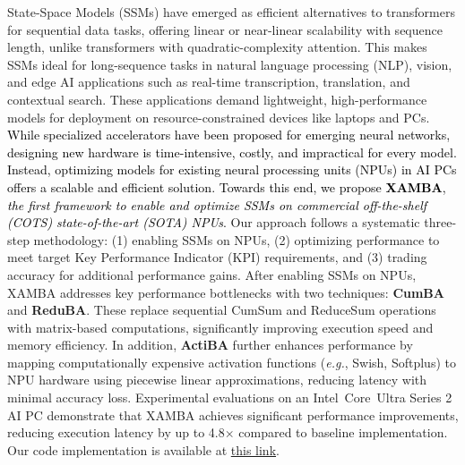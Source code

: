 State-Space Models (SSMs) have emerged as efficient alternatives to transformers for sequential data tasks, offering linear or near-linear scalability with sequence length, unlike transformers with quadratic-complexity attention. This makes SSMs ideal for long-sequence tasks in natural language processing (NLP), vision, and edge AI applications such as real-time transcription, translation, and contextual search. These applications demand lightweight, high-performance models for deployment on resource-constrained devices like laptops and PCs. 
\textcolor{black}{While specialized accelerators have been proposed for emerging neural networks, designing new hardware is time-intensive, costly, and impractical for every model. Instead, optimizing models for existing neural processing units (NPUs) in AI PCs offers a scalable and efficient solution.
Towards this end, we propose \textbf{XAMBA}, \textit{the first framework to enable and optimize SSMs on commercial off-the-shelf (COTS) state-of-the-art (SOTA) NPUs}.}
Our approach follows a systematic three-step methodology: (1) enabling SSMs on NPUs, (2) optimizing performance to meet target Key Performance Indicator (KPI) requirements, and (3) trading accuracy for additional performance gains. After enabling SSMs on NPUs, XAMBA addresses key performance bottlenecks with two techniques: \textbf{CumBA} and \textbf{ReduBA}. These replace sequential CumSum and ReduceSum operations with matrix-based computations, significantly improving execution speed and memory efficiency. In addition, \textbf{ActiBA} further enhances performance by mapping computationally expensive activation functions (\emph{e.g.}, Swish, Softplus) to NPU hardware using piecewise linear approximations, reducing latency with minimal accuracy loss. Experimental evaluations on an Intel\textregistered\ Core\texttrademark\ Ultra Series 2 AI PC demonstrate that XAMBA achieves significant performance improvements, reducing execution latency by up to 4.8$\times$ compared to baseline implementation. Our code implementation is available at \href{https://github.com/arghadippurdue/XAMBA}{this link}.





